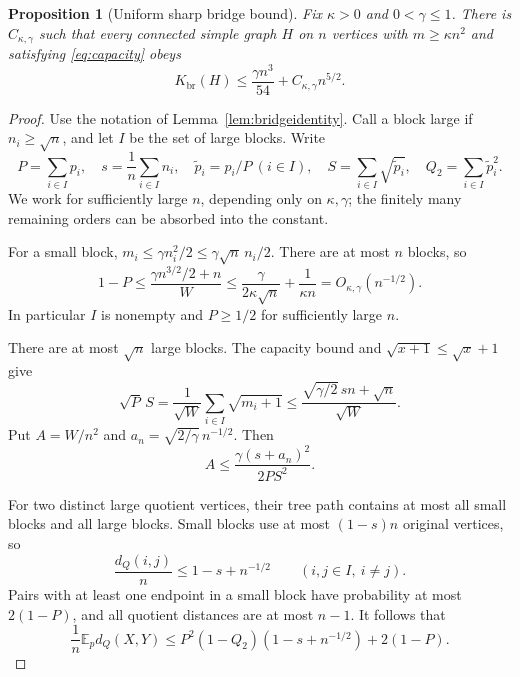 \documentclass[11pt]{amsart}
\numberwithin{equation}{section}
\newtheorem{proposition}[theorem]{Proposition}
\theoremstyle{definition}
\theoremstyle{remark}
\newcommand{\E}{\mathbb E}
\newcommand{\Kbr}{K_{\mathrm{br}}}
\begin{document}
\begin{proposition}[Uniform sharp bridge bound]\label{prop:bridgebound}
Fix $\kappa>0$ and $0<\gamma\le1$. There is $C_{\kappa,\gamma}$ such that every connected simple graph $H$ on $n$ vertices with $m\ge\kappa n^2$ and satisfying \eqref{eq:capacity} obeys
\begin{equation}\label{eq:bridgebound}
\Kbr(H)\le\frac{\gamma n^3}{54}+C_{\kappa,\gamma}n^{5/2}.
\end{equation}
\end{proposition}
\begin{proof}
Use the notation of Lemma~\ref{lem:bridgeidentity}. Call a block large if $n_i\ge\sqrt n$, and let $I$ be the set of large blocks. Write
\[
P=\sum_{i\in I}p_i,\quad
s=\frac1n\sum_{i\in I}n_i,\quad
\widetilde p_i=p_i/P\ (i\in I),\quad
S=\sum_{i\in I}\sqrt{\widetilde p_i},\quad
Q_2=\sum_{i\in I}\widetilde p_i^2.
\]
We work for sufficiently large $n$, depending only on $\kappa,\gamma$; the finitely many remaining orders can be absorbed into the constant.

For a small block, $m_i\le\gamma n_i^2/2\le\gamma\sqrt n\,n_i/2$. There are at most $n$ blocks, so
\begin{equation}\label{eq:smallmass}
1-P\le\frac{\gamma n^{3/2}/2+n}{W}
\le\frac{\gamma}{2\kappa\sqrt n}+\frac1{\kappa n}
=O_{\kappa,\gamma}(n^{-1/2}).
\end{equation}
In particular $I$ is nonempty and $P\ge1/2$ for sufficiently large $n$.

There are at most $\sqrt n$ large blocks. The capacity bound and $\sqrt{x+1}\le\sqrt x+1$ give
\[
\sqrt P\,S=\frac1{\sqrt W}\sum_{i\in I}\sqrt{m_i+1}
\le\frac{\sqrt{\gamma/2}\,sn+\sqrt n}{\sqrt W}.
\]
Put $A=W/n^2$ and $a_n=\sqrt{2/\gamma}\,n^{-1/2}$. Then
\begin{equation}\label{eq:capacitymass}
A\le\frac{\gamma(s+a_n)^2}{2PS^2}.
\end{equation}

For two distinct large quotient vertices, their tree path contains at most all small blocks and all large blocks. Small blocks use at most $(1-s)n$ original vertices, so
\[
\frac{d_Q(i,j)}n\le1-s+n^{-1/2}\qquad(i,j\in I,
\ i\ne j).
\]
Pairs with at least one endpoint in a small block have probability at most $2(1-P)$, and all quotient distances are at most $n-1$. It follows that
\begin{equation}\label{eq:distancebudget}
\frac1n\E_p d_Q(X,Y)
\le P^2(1-Q_2)(1-s+n^{-1/2})+2(1-P).
\end{equation}


\end{proof}
\end{document}
